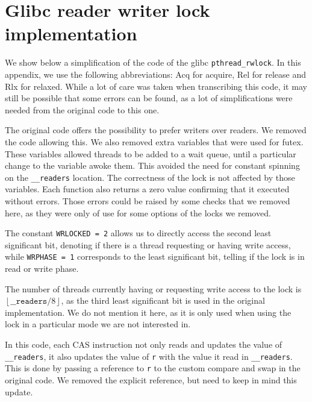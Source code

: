 \chapter{Glibc reader writer lock implementation}
\label{app:glibc}
We show below a simplification of the code of the glibc \texttt{pthread\_rwlock}\cite{glibcRW}. In this appendix, we use the following abbreviations: Acq for acquire, Rel for release and Rlx for relaxed. While a lot of care was taken when transcribing this code, it may still be possible that some errors can be found, as a lot of simplifications were needed from the original code to this one.

The original code offers the possibility to prefer writers over readers. We removed the code allowing this. We also removed extra variables that were used for futex. These variables allowed threads to be added to a wait queue, until a particular change to the variable awoke them. This avoided the need for constant spinning on the \texttt{\_\_readers} location. The correctness of the lock is not affected by those variables. Each function also returns a zero value confirming that it executed without errors. Those errors could be raised by some checks that we removed here, as they were only of use for some options of the locks we removed.%

The constant \texttt{WRLOCKED = 2} allows us to directly access the second least significant bit, denoting if there is a thread requesting or having write access, while \texttt{WRPHASE = 1} corresponds to the least significant bit, telling if the lock is in read or write phase.

The number of threads currently having or requesting write access to the lock is $\left \lfloor \mathtt{\_\_readers} / 8 \right \rfloor$, as the third least significant bit is used in the original implementation. We do not mention it here, as it is only used when using the lock in a particular mode we are not interested in. 

In this code, each CAS instruction not only reads and updates the value of \texttt{\_\_readers}, it also updates the value of \texttt{r} with the value it read in \texttt{\_\_readers}. This is done by passing a reference to \texttt{r} to the custom compare and swap in the original code. We removed the explicit reference, but need to keep in mind this update.

